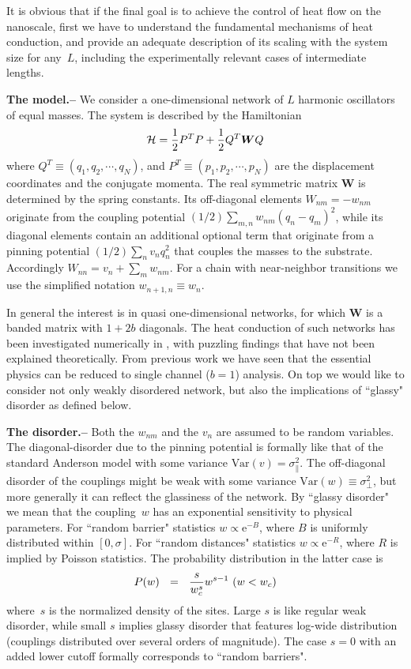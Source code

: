 \documentclass[onecolumn,fleqn,notitlepage,secnumarabic]{revtex4}
\newcommand{\eexp}{\mbox{e}^}
\newcommand{\be}[1]{\begin{eqnarray}\ifthenelse{#1=-1}{\nonumber}{\ifthenelse{#1=0}{}{\label{e#1}}}}
\newcommand{\ee}{\end{eqnarray}}
\newcommand{\beq}{\be{1}}
\newcommand{\eeq}{\ee}
\newcommand{\sect}[1]{{\bf #1.-- }}
\begin{document}

It is obvious that if the final goal 
is to achieve the control of heat flow on the nanoscale, 
first we have to understand the fundamental mechanisms of heat conduction, 
and provide an adequate description of its scaling with the system size for any~$L$, 
including the experimentally relevant cases of intermediate lengths.

\sect{The model}
%
We consider a one-dimensional network of $L$ harmonic oscillators of equal masses. 
The system is described by the Hamiltonian 
% 
\begin{equation}
{\cal H} = {1\over 2} P^T P + {1\over 2} Q^T \bm{W} Q 
\label{Hmatrix} 
\end{equation}
%
where $Q^T\equiv(q_1,q_2,\cdots,q_N)$, and $P^T\equiv(p_1,p_2,\cdots,p_N)$ 
are the displacement coordinates and the conjugate momenta. 
The real symmetric matrix  $\bm{W}$ is determined by the spring constants.
Its off-diagonal elements $W_{nm}{=}-w_{nm}$ originate from 
the coupling potential $(1/2)\sum_{m,n}w_{nm}(q_n-q_m)^2$, 
while its diagonal elements contain an additional 
optional term that originate from a pinning potential ${(1/2)\sum_n v_n q_n^2}$ 
that couples the masses to the substrate. 
Accordingly ${W_{nn}=v_n+\sum_m w_{nm}}$. 
For a chain with near-neighbor transitions we use 
the simplified notation ${w_{n{+}1,n} \equiv w_n}$.  


In general the interest is in quasi one-dimensional networks, 
for which $\bm{W}$ is a banded matrix with ${1{+}2b}$ diagonals. 
The heat conduction of such networks has been investigated numerically 
in \cite{BZFK13}, with puzzling findings that have not been explained 
theoretically. From previous work we have seen that the essential physics can be 
reduced to single channel ($b=1$) analysis. On top we would like  
to consider not only weakly disordered network, but also 
the implications of ``glassy" disorder as defined below.   


\sect{The disorder}
%
Both the $w_{nm}$ and the $v_n$ are assumed to 
be random variables. The diagonal-disorder due to the pinning
potential is formally like that of the standard Anderson model 
with some variance ${\mbox{Var}(v)=\sigma_{\parallel}^2}$.    
The off-diagonal disorder of the couplings might be 
weak with some variance ${\mbox{Var}(w) \equiv \sigma_{\perp}^2}$, 
but more generally it can reflect the glassiness of the network. 
%
By ``glassy disorder" we mean that the coupling~$w$ has an 
exponential sensitivity to physical parameters.  
For ``random barrier" statistics ${ w \propto \eexp{-B} }$, 
where $B$ is uniformly distributed within $[0,\sigma]$. 
For ``random distances" statistics ${ w \propto \eexp{-R} }$,
where $R$ is implied by Poisson statistics. 
The probability distribution in the latter case is 
%
\beq
P(w) \ \ = \ \ \frac{s}{w_c^{s}} w^{s-1} \ (w<w_c)
\eeq
%
where~$s$ is the normalized density of the sites.
Large $s$ is like regular weak disorder, while small $s$ 
implies glassy disorder that features log-wide distribution  
(couplings distributed over several orders of magnitude). 
The case $s=0$ with an added lower cutoff 
formally corresponds to ``random barriers". 
\end{document}
